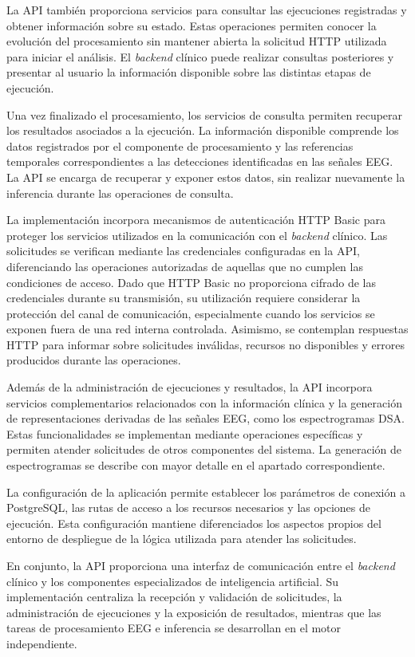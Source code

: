 La API también proporciona servicios para
consultar las ejecuciones registradas y
obtener información sobre su estado. Estas
operaciones permiten conocer la evolución
del procesamiento sin mantener abierta
la solicitud HTTP utilizada para iniciar
el análisis. El \textit{backend} clínico puede
realizar consultas posteriores y presentar
al usuario la información disponible sobre
las distintas etapas de ejecución.

Una vez finalizado el procesamiento, los
servicios de consulta permiten recuperar
los resultados asociados a la ejecución.
La información disponible comprende los
datos registrados por el componente de
procesamiento y las referencias temporales
correspondientes a las detecciones
identificadas en las señales EEG. La API
se encarga de recuperar y exponer estos
datos, sin realizar nuevamente la inferencia
durante las operaciones de consulta.


La implementación incorpora mecanismos de autenticación
HTTP Basic para proteger los servicios utilizados en la
comunicación con el \textit{backend} clínico. Las solicitudes se
verifican mediante las credenciales configuradas en la API,
diferenciando las operaciones autorizadas de aquellas que
no cumplen las condiciones de acceso. Dado que HTTP Basic
no proporciona cifrado de las credenciales durante su
transmisión, su utilización requiere considerar la
protección del canal de comunicación, especialmente
cuando los servicios se exponen fuera de una red interna
controlada. Asimismo, se contemplan respuestas HTTP
para informar sobre solicitudes inválidas, recursos no
disponibles y errores producidos durante las operaciones.


Además de la administración de ejecuciones
y resultados, la API incorpora servicios
complementarios relacionados con la
información clínica y la generación de
representaciones derivadas de las señales
EEG, como los espectrogramas DSA. Estas
funcionalidades se implementan mediante
operaciones específicas y permiten atender
solicitudes de otros componentes del sistema.
La generación de espectrogramas se describe
con mayor detalle en el apartado correspondiente.

La configuración de la aplicación permite
establecer los parámetros de conexión a
PostgreSQL, las rutas de acceso a los recursos
necesarios y las opciones de ejecución. Esta configuración
mantiene diferenciados los aspectos propios
del entorno de despliegue de la lógica
utilizada para atender las solicitudes.

En conjunto, la API proporciona una interfaz
de comunicación entre el \textit{backend} clínico
y los componentes especializados de
inteligencia artificial. Su implementación
centraliza la recepción y validación de
solicitudes, la administración de ejecuciones
y la exposición de resultados, mientras
que las tareas de procesamiento EEG e
inferencia se desarrollan en el motor independiente.


